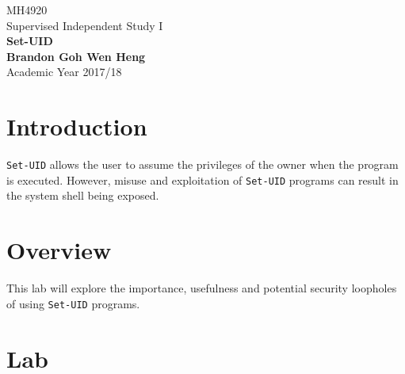 \documentclass[a4paper,12pt]{article}
\newcommand{\setuid}{\texttt{Set-UID} }
\begin{document}
	\begin{titlepage}
		\begin{center}
			\vspace*{9em}
			\Huge 
			MH4920\\ Supervised Independent Study I\\
			\vspace*{4em}
			\LARGE
			\textbf{Set-UID\\}		
			\vspace{4em}
			\textbf{Brandon Goh Wen Heng}\\
			\vspace*{4em}
			Academic Year 2017/18
			\vfill
		\end{center}
	\end{titlepage}
\tableofcontents
\newpage
{}
\section{Introduction}
\setuid allows the user to assume the privileges of the owner when the program is executed. However, misuse and exploitation of \texttt{Set-UID} programs can result in the system shell being exposed.
\section{Overview}
This lab will explore the importance, usefulness and potential security loopholes of using \texttt{Set-UID} programs.
\newpage
\section{Lab}
\end{document}
